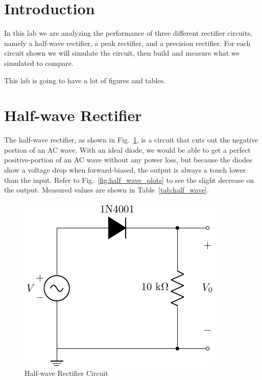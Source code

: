 \documentclass{../../ece-report}
\begin{document}
\maketitle
\section{Introduction}

In this lab we are analyzing the performance of three
different rectifier circuits, namely a half-wave rectifier,
a peak rectifier, and a precision rectifier. For each
circuit shown we will simulate the circuit, then build
and measure what we simulated to compare.

This lab is going to have a lot of figures and tables.

\section{Half-wave Rectifier}

The half-wave rectifier, as shown in Fig.~\ref{fig:half_wave_circuit},
is a circuit that cuts out the negative portion of an
AC wave. With an ideal diode, we would be able to get
a perfect positive-portion of an AC wave without any
power loss, but because the diodes show a voltage drop
when forward-biased, the output is always a touch lower
than the input. Refer to Fig.~\ref{fig:half_wave_plots}
to see the slight decrease on the output. Measured values
are shown in Table~\ref{tab:half_wave}.

\begin{figure}[h!]
  \centering
  \includegraphics{../circuits/half_wave_circuit.pdf}
  \caption{Half-wave Rectifier Circuit}
  \label{fig:half_wave_circuit}
\end{figure}
\end{document}
